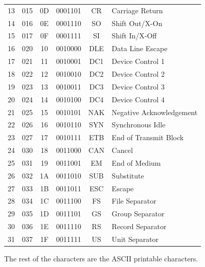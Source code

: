 \begin{definition}[ASCII]
\begin{center}
{\begin{tabular}{ |c|c|c|c|c|l| }
        13 & 015 & 0D & 0001101 & CR & Carriage Return \\
        14 & 016 & 0E & 0001110 & SO & Shift Out/X-On\\
        15 & 017 & 0F & 0001111 & SI & Shift In/X-Off\\
        16 & 020 & 10 & 0010000 & DLE & Data Line Escape\\
        17 & 021 & 11 & 0010001 & DC1 & Device Control 1\\
        18 & 022 & 12 & 0010010 & DC2 & Device Control 2\\
        19 & 023 & 13 & 0010011 & DC3 & Device Control 3\\
        20 & 024 & 14 & 0010100 & DC4 & Device Control 4 \\
        21 & 025 & 15 & 0010101 & NAK & Negative Acknowledgement\\
        22 & 026 & 16 & 0010110 & SYN & Synchronous Idle \\
        23 & 027 & 17 & 0010111 & ETB & End of Transmit Block\\
        24 & 030 & 18 & 0011000 & CAN & Cancel\\
        25 & 031 & 19 & 0011001 & EM & End of Medium\\
        26 & 032 & 1A & 0011010 & SUB & Substitute\\
        27 & 033 & 1B & 0011011 & ESC & Escape\\
        28 & 034 & 1C & 0011100 & FS & File Separator \\
        29 & 035 & 1D & 0011101 & GS & Group Separator\\
        30 & 036 & 1E & 0011110 & RS & Record Separator \\
        31 & 037 & 1F & 0011111 & US & Unit Separator\\
        \hline
      \end{tabular}}
      \end{center}

      The rest of the characters are the ASCII printable characters. 


\end{definition}
